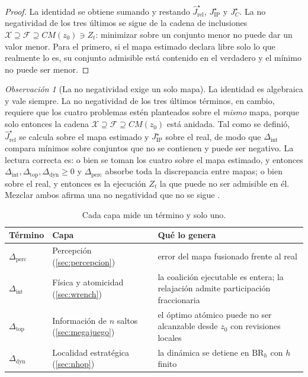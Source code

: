 \documentclass[11pt,a4paper]{article}
\theoremstyle{plain}
\theoremstyle{definition}
\theoremstyle{remark}
\newtheorem{observacion}[teorema]{Observación}
\newcommand{\Xcal}{\mathcal{X}}
\newcommand{\Fcal}{\mathcal{F}}
\begin{document}
\begin{proof}
La identidad se obtiene sumando y restando
$\hat J^{\star}_{\mathrm{rel}}$, $J^{\star}_{\mathrm{IP}}$ y $J^{\star}_{C}$.
La no negatividad de los tres últimos se sigue de la cadena de inclusiones
$\Xcal\supseteq\Fcal\supseteq CM(z_0)\ni Z_t$: minimizar sobre un conjunto
menor no puede dar un valor menor. Para el primero, si el mapa estimado declara
libre solo lo que realmente lo es, su conjunto admisible está contenido en el
verdadero y el mínimo no puede ser menor.
\end{proof}

\begin{observacion}[La no negatividad exige un solo mapa]
\label{obs:descomposicion-mapa}
La identidad es algebraica y vale siempre. La no negatividad de los tres \'ultimos
términos, en cambio, requiere que los cuatro problemas estén planteados sobre el
\emph{mismo} mapa, porque solo entonces la cadena $\Xcal\supseteq\Fcal\supseteq CM(z_0)$
está anidada. Tal como se definió, $\hat J^\star_{\mathrm{rel}}$ se calcula sobre el mapa
estimado y $J^\star_{\mathrm{IP}}$ sobre el real, de modo que
$\Delta_{\mathrm{int}}$ compara mínimos sobre conjuntos que no se contienen y
puede ser negativo. La lectura correcta es: o bien se toman los cuatro sobre el
mapa estimado, y entonces $\Delta_{\mathrm{int}},\Delta_{\mathrm{top}},\Delta_{\mathrm{dyn}}\ge0$
y $\Delta_{\mathrm{perc}}$ absorbe toda la discrepancia entre mapas; o bien sobre el
real, y entonces es la ejecución $Z_t$ la que puede no ser admisible en él. Mezclar ambos afirma una no negatividad que no se sigue \cite{mayorga2026m1}.
\end{observacion}

\begin{table}[!ht]
\centering
\small
\caption{Cada capa mide un término y solo uno.}
\label{tab:mapeo}
\begin{tabularx}{\textwidth}{@{}llX@{}}
\toprule
Término & Capa & Qué lo genera \\
\midrule
$\Delta_{\mathrm{perc}}$ & Percepción (\cref{sec:percepcion})
  & error del mapa fusionado frente al real \\
$\Delta_{\mathrm{int}}$ & Física y atomicidad (\cref{sec:wrench})
  & la coalición ejecutable es entera; la relajación admite participación
    fraccionaria \\
$\Delta_{\mathrm{top}}$ & Información de $n$ saltos (\cref{sec:megajuego})
  & el óptimo atómico puede no ser alcanzable desde $z_0$ con revisiones
    locales \\
$\Delta_{\mathrm{dyn}}$ & Localidad estratégica (\cref{sec:nhop})
  & la dinámica se detiene en $\mathrm{BR}_h$ con $h$ finito \\
\bottomrule
\end{tabularx}
\end{table}
\end{document}
